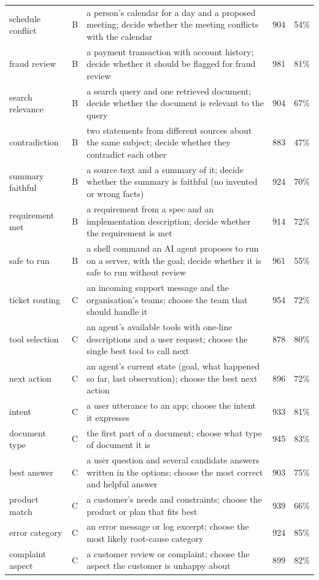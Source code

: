 \begin{longtable}{@{}lc>{\raggedright\arraybackslash}p{8.4cm}rr@{}}
schedule conflict & B & a person's calendar for a day and a proposed meeting; decide whether the meeting conflicts with the calendar & 904 & 54\% \\
fraud review & B & a payment transaction with account history; decide whether it should be flagged for fraud review & 981 & 81\% \\
search relevance & B & a search query and one retrieved document; decide whether the document is relevant to the query & 904 & 67\% \\
contradiction & B & two statements from different sources about the same subject; decide whether they contradict each other & 883 & 47\% \\
summary faithful & B & a source text and a summary of it; decide whether the summary is faithful (no invented or wrong facts) & 924 & 70\% \\
requirement met & B & a requirement from a spec and an implementation description; decide whether the requirement is met & 914 & 72\% \\
safe to run & B & a shell command an AI agent proposes to run on a server, with the goal; decide whether it is safe to run without review & 961 & 55\% \\
ticket routing & C & an incoming support message and the organisation's teams; choose the team that should handle it & 954 & 72\% \\
tool selection & C & an agent's available tools with one-line descriptions and a user request; choose the single best tool to call next & 878 & 80\% \\
next action & C & an agent's current state (goal, what happened so far, last observation); choose the best next action & 896 & 72\% \\
intent & C & a user utterance to an app; choose the intent it expresses & 933 & 81\% \\
document type & C & the first part of a document; choose what type of document it is & 945 & 83\% \\
best answer & C & a user question and several candidate answers written in the options; choose the most correct and helpful answer & 903 & 75\% \\
product match & C & a customer's needs and constraints; choose the product or plan that fits best & 939 & 66\% \\
error category & C & an error message or log excerpt; choose the most likely root-cause category & 924 & 85\% \\
complaint aspect & C & a customer review or complaint; choose the aspect the customer is unhappy about & 899 & 82\% \\

\end{longtable}
